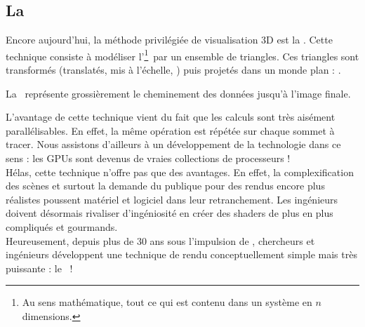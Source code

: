 \subsection{La \label{sec:rasterization}}
Encore aujourd'hui, la méthode privilégiée de visualisation 3D est la
. Cette technique consiste à modéliser
l'\footnote{Au sens mathématique, \ie tout ce qui est contenu
dans un système en $n$ dimensions.}\ par un ensemble de triangles. Ces
triangles sont transformés (\eg translatés, mis à l'échelle, \etc) puis
projetés dans un monde plan : .

La \ représente grossièrement le
cheminement des données jusqu'à l'image finale.



L'avantage de cette technique vient du fait que les calculs sont très aisément
parallélisables. En effet, la même opération est répétée sur chaque sommet à
tracer. Nous assistons d'ailleurs à un développement de la technologie dans ce
sens : les \glspl{GPU} sont devenus de vraies collections de processeurs !\\

Hélas, cette technique n'offre pas que des avantages. En effet, la
complexification des scènes et surtout la demande du publique pour des rendus
encore plus réalistes poussent matériel et logiciel dans leur retranchement.
Les ingénieurs doivent désormais rivaliser d'ingéniosité en créer des
\glspl{shader} de plus en plus compliqués et gourmands.\\

Heureusement, depuis plus de 30 ans sous l'impulsion de \cite{Whitted1980},
chercheurs et ingénieurs développent une technique de rendu conceptuellement
simple mais très puissante : le \raytracing{}\ !
